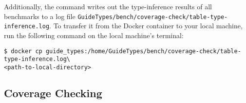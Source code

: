 Additionally, the command writes out the type-inference results of all
benchmarks to a log file
\texttt{GuideTypes/bench/coverage-check/table-type-inference.log}.
%
To transfer it from the Docker container to your local machine, run the
following command on the local machine's terminal:
\begin{verbatim}
$ docker cp guide_types:/home/GuideTypes/bench/coverage-check/table-type-inference.log\
<path-to-local-directory>
\end{verbatim}

\subsection{Coverage Checking}


